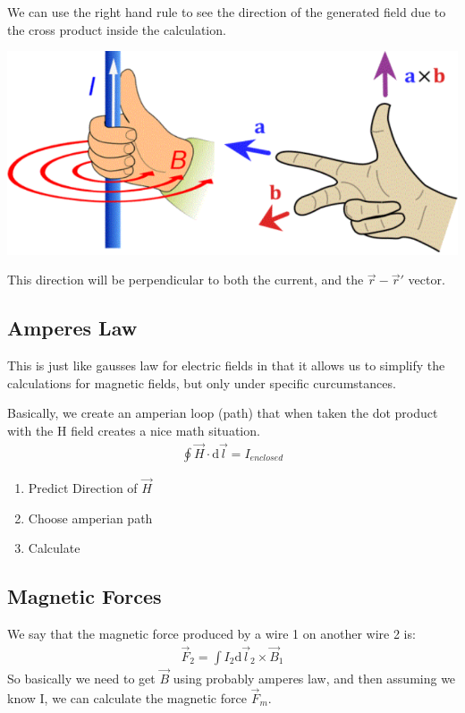\documentclass[12pt,letterpaper]{article} \usepackage{amsmath} \usepackage{graphicx} \usepackage[margin=1in]{geometry} \usepackage{longtable}  \usepackage{amssymb}
\begin{document}
	We can use the right hand rule to see the direction of the generated field due to the cross product inside the calculation. 
	\begin{center}
		\includegraphics[width=0.7\linewidth]{rhr}
	\end{center}

	This direction will be perpendicular to both the current, and the $\vec r-\vec r\prime$ vector. 
	
	\subsection{Amperes Law}
	This is just like gausses law for electric fields in that it allows us to simplify the calculations for magnetic fields, but only under specific curcumstances. 
	
	Basically, we create an amperian loop (path) that when taken the dot product with the H field creates a nice math situation.
	\begin{align*}
		\oint \vec H \cdot \mathrm d \vec l = I_{enclosed}
	\end{align*}
	\begin{enumerate}[noitemsep]
		\item Predict Direction of $\vec H$
		\item Choose amperian path
		\item Calculate
	\end{enumerate}

	\subsection{Magnetic Forces}
	We say that the magnetic force produced by a wire 1 on another wire 2 is: 
	\begin{align*}
		\vec F_2 = \int I_2\mathrm d \vec l_2 \times \vec B_1
	\end{align*}
	So basically we need to get $\vec B$ using probably amperes law, and then assuming we know I, we can calculate the magnetic force $\vec F_m$.
	
	
	
	
	
\end{document}
